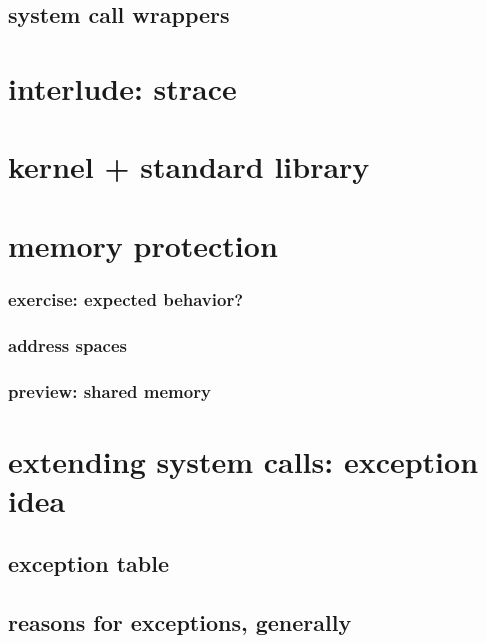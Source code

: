 \subsection{system call wrappers}

% 

\section{interlude: strace}


\section{kernel + standard library}

\section{memory protection}

\subsubsection{exercise: expected behavior?}


\subsubsection{address spaces}


\subsubsection{preview: shared memory}


\section{extending system calls: exception idea}



\subsection{exception table}


\subsection{reasons for exceptions, generally}




